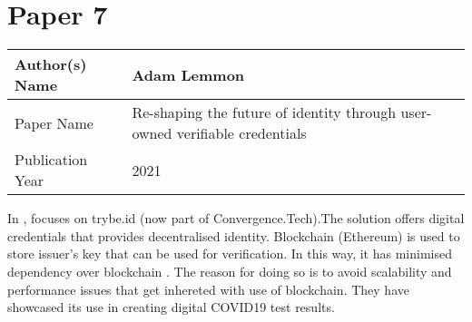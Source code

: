 \section{Paper 7}
    \begin{center}
    \begin{tabular}{ | m{5em} | m{25em} |} 
      \hline
      Author(s) Name & Adam Lemmon\\ 
      \hline
      Paper Name &  Re-shaping the future of identity through user-owned verifiable credentials\\ 
      \hline
      Publication Year &  2021\\ 
      \hline
    \end{tabular}
    \end{center}
    In \cite{9461078}, focuses on trybe.id (now part of Convergence.Tech).The solution offers digital credentials that provides decentralised identity. Blockchain (Ethereum) is used to store issuer's key that can be used for verification. In this way, it has minimised dependency over blockchain . The reason for doing so is to avoid scalability and performance issues that get inhereted with use of blockchain. They have showcased its use in creating digital COVID19 test results.